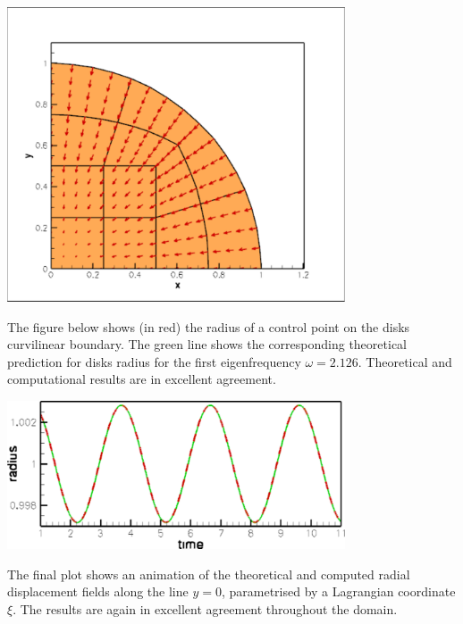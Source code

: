  
\begin{DoxyImage}
\includegraphics[width=0.75\textwidth]{displ}
\end{DoxyImage}


The figure below shows (in red) the radius of a control point on the disk\textquotesingle{}s curvilinear boundary. The green line shows the corresponding theoretical prediction for disk\textquotesingle{}s radius for the first eigenfrequency $ \omega = 2.126. $ Theoretical and computational results are in excellent agreement.

 
\begin{DoxyImage}
\includegraphics[width=0.75\textwidth]{trace}
\end{DoxyImage}


The final plot shows an animation of the theoretical and computed radial displacement fields along the line $ y=0 $, parametrised by a Lagrangian coordinate $ \xi $. The results are again in excellent agreement throughout the domain.


